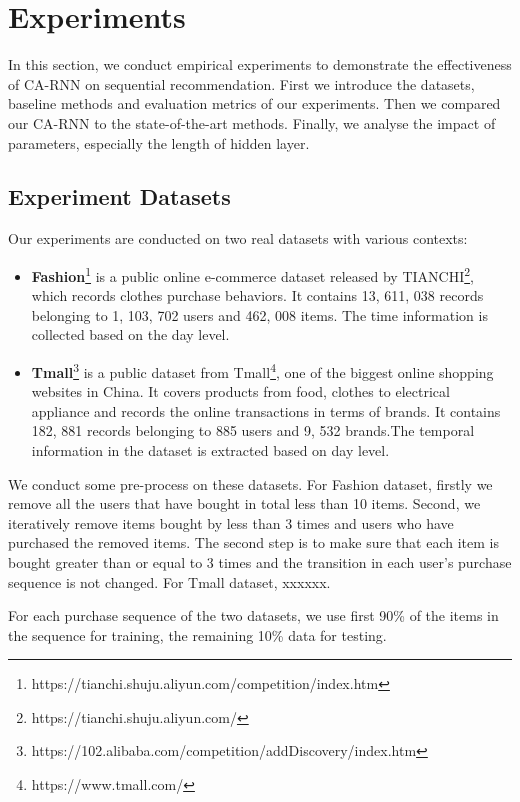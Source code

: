 \documentclass[conference]{IEEEtran}
\begin{document}
\section{Experiments}
In this section, we conduct empirical experiments to demonstrate the effectiveness of CA-RNN on sequential recommendation. First we introduce the datasets, baseline methods and evaluation metrics of our experiments. Then we compared our CA-RNN to the state-of-the-art methods. Finally, we analyse the impact of parameters, especially the length of hidden layer.
\subsection{Experiment Datasets}
Our experiments are conducted on two real datasets with various contexts:
\begin{itemize}
\item \textbf{Fashion}\footnote{https://tianchi.shuju.aliyun.com/competition/index.htm} is a public online e-commerce dataset released by TIANCHI\footnote{https://tianchi.shuju.aliyun.com/}, which records clothes purchase behaviors. It contains 13, 611, 038 records belonging to 1, 103, 702 users and 462, 008 items. The time information is collected based on the day level.

\item \textbf{Tmall}\footnote{https://102.alibaba.com/competition/addDiscovery/index.htm} is a public dataset from Tmall\footnote{https://www.tmall.com/}, one of the biggest online shopping websites in China. It covers products from food, clothes to electrical appliance and records the online transactions in terms of brands. It contains 182, 881 records belonging to 885 users and 9, 532 brands.The temporal information in the dataset is extracted based on day level.
\end{itemize}

We conduct some pre-process on these datasets. For Fashion dataset, firstly we remove all the users that have bought in total less than 10 items. Second, we iteratively remove items bought by less than 3 times and users who have purchased the removed items. The second step is to make sure that each item is bought greater than or equal to 3 times and the transition in each user's purchase sequence is not changed. For Tmall dataset, xxxxxx.

For each purchase sequence of the two datasets, we use first 90\% of the items in the sequence for training, the remaining 10\% data for testing. 
\end{document}

